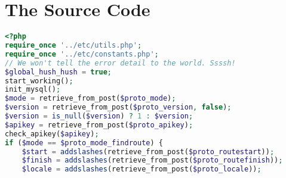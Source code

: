 \singlespacing 

\chapter{The Source Code}
\label{app:A}

\begin{lstlisting}[language=PHP,basicstyle=\tiny,caption=handle.php,label={lst:handle.php}]
<?php
require_once '../etc/utils.php';
require_once '../etc/constants.php';
// We won't tell the error detail to the world. Ssssh!
$global_hush_hush = true;
start_working();
init_mysql();
$mode = retrieve_from_post($proto_mode);
$version = retrieve_from_post($proto_version, false);
$version = is_null($version) ? 1 : $version;
$apikey = retrieve_from_post($proto_apikey);
check_apikey($apikey);
if ($mode == $proto_mode_findroute) {
	$start = addslashes(retrieve_from_post($proto_routestart));
	$finish = addslashes(retrieve_from_post($proto_routefinish));
	$locale = addslashes(retrieve_from_post($proto_locale));
	

\end{lstlisting}
